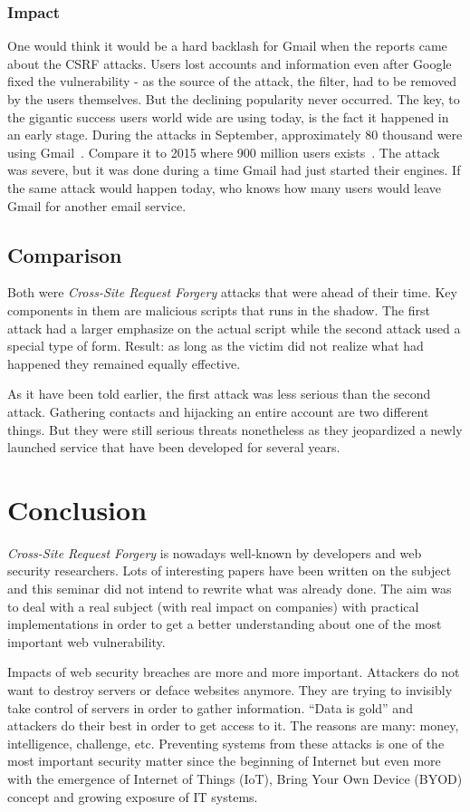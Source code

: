 \documentclass[a4paper,11pt,openany]{report}
\newcommand{\csrf}{\textit{Cross-Site Request Forgery}}
\begin{document}
  \subsubsection{Impact}
  One would think it would be a hard backlash for Gmail when the reports came about the CSRF attacks. Users lost 
  accounts and information even after Google fixed the vulnerability - as the source of the attack, the filter, 
  had to be removed by the users themselves. But the declining popularity never occurred. The key, to the gigantic
  success users world wide are using today, is the fact it happened in an early stage. During the attacks in 
  September, approximately 80 thousand were using Gmail~\cite{techcrunch}. Compare it to 2015 where 900 million users exists~\cite{dmr}.
  The attack was severe, but it was done during a time Gmail had just started their engines. If the same attack
  would happen today, who knows how many users would leave Gmail for another email service.

  \subsection{Comparison}
  Both were \csrf{} attacks that were ahead of their time. Key components in them are malicious scripts that runs in the 
  shadow. The first attack had a larger emphasize on the actual script while the second attack used a special type of 
  form. Result: as long as the victim did not realize what had happened they remained equally effective.
  
  As it have been told earlier, the first attack was less serious than the second attack. Gathering contacts and 
  hijacking an entire account are two different things. But they were still serious threats nonetheless as they
  jeopardized a newly launched service that have been developed for several years. 
  
  \section{Conclusion}
  \csrf{} is nowadays well-known by developers and web security researchers. Lots of interesting papers have been written 
  on the subject and this seminar did not intend to rewrite what was already done. The aim was to deal with a real subject 
  (with real impact on companies) with practical implementations in order to get a better understanding about one of the 
  most important web vulnerability.
  
  Impacts of web security breaches are more and more important. Attackers do not want to destroy servers or deface 
  websites anymore. They are trying to invisibly take control of servers in order to gather information. ``Data is gold'' 
  and attackers do their best in order to get access to it. The reasons are many: money, intelligence, challenge, etc. 
  Preventing systems from these attacks is one of the most important security matter since the beginning of Internet but 
  even more with the emergence of Internet of Things (IoT), Bring Your Own Device (BYOD) concept and growing exposure of 
  IT systems.
  
\end{document}
